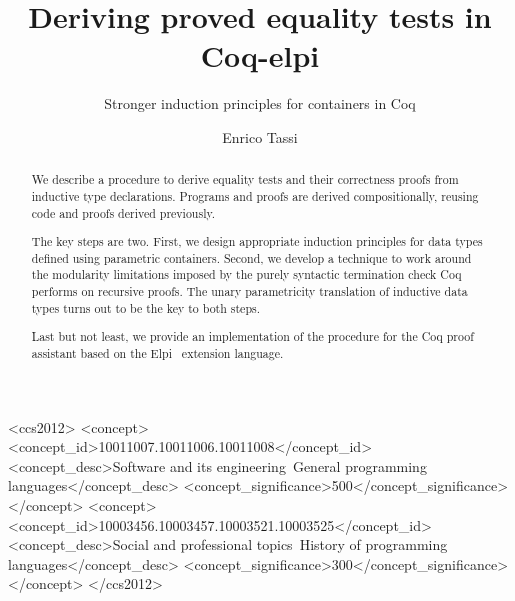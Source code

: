 \documentclass[sigplan,10pt,review]{acmart}\settopmatter{printfolios=true,printccs=false,printacmref=false}
\begin{document}
\title{Deriving proved equality tests in Coq-elpi}
\subtitle{Stronger induction principles for containers in Coq}

\author{Enrico Tassi}



\begin{abstract}
We describe a procedure to derive equality tests and their correctness
proofs from inductive type declarations.  Programs and proofs
are derived compositionally, reusing code and proofs derived
previously.  

The key steps are two. First, we
design appropriate induction principles for data types defined
using parametric containers. Second, we
develop a technique to work around the modularity limitations
imposed by the purely syntactic termination check Coq performs
on recursive proofs. 
The unary parametricity translation of inductive data types
turns out to be the key to both steps.

Last but not least, we provide an implementation of the procedure
	for the Coq proof assistant based on the Elpi~\cite{dunchev:hal-01176856} extension language.
\end{abstract}


\begin{CCSXML}
<ccs2012>
<concept>
<concept_id>10011007.10011006.10011008</concept_id>
<concept_desc>Software and its engineering~General programming languages</concept_desc>
<concept_significance>500</concept_significance>
</concept>
<concept>
<concept_id>10003456.10003457.10003521.10003525</concept_id>
<concept_desc>Social and professional topics~History of programming languages</concept_desc>
<concept_significance>300</concept_significance>
</concept>
</ccs2012>
\end{CCSXML}

\end{document}
